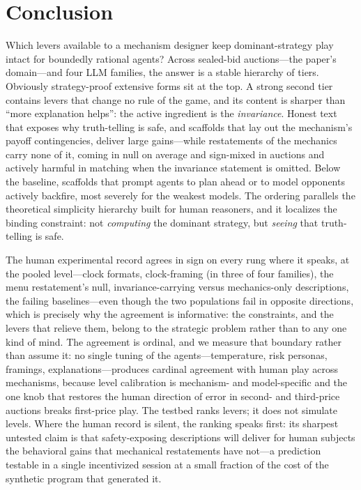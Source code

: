 
\section{Conclusion}\label{sec:conclusion}

Which levers available to a mechanism designer keep dominant-strategy play intact for boundedly rational agents? Across sealed-bid auctions---the paper's domain---and four LLM families, the answer is a stable hierarchy of tiers. Obviously strategy-proof extensive forms sit at the top. A strong second tier contains levers that change no rule of the game, and its content is sharper than ``more explanation helps'': the active ingredient is the \emph{invariance}. Honest text that exposes why truth-telling is safe, and scaffolds that lay out the mechanism's payoff contingencies, deliver large gains---while restatements of the mechanics carry none of it, coming in null on average and sign-mixed in auctions and actively harmful in matching when the invariance statement is omitted. Below the baseline, scaffolds that prompt agents to plan ahead or to model opponents actively backfire, most severely for the weakest models. The ordering parallels the theoretical simplicity hierarchy built for human reasoners, and it localizes the binding constraint: not \emph{computing} the dominant strategy, but \emph{seeing} that truth-telling is safe.

The human experimental record agrees in sign on every rung where it speaks, at the pooled level---clock formats, clock-framing (in three of four families), the menu restatement's null, invariance-carrying versus mechanics-only descriptions, the failing baselines---even though the two populations fail in opposite directions, which is precisely why the agreement is informative: the constraints, and the levers that relieve them, belong to the strategic problem rather than to any one kind of mind. The agreement is ordinal, and we measure that boundary rather than assume it: no single tuning of the agents---temperature, risk personas, framings, explanations---produces cardinal agreement with human play across mechanisms, because level calibration is mechanism- and model-specific and the one knob that restores the human direction of error in second- and third-price auctions breaks first-price play. The testbed ranks levers; it does not simulate levels. Where the human record is silent, the ranking speaks first: its sharpest untested claim is that safety-exposing descriptions will deliver for human subjects the behavioral gains that mechanical restatements have not---a prediction testable in a single incentivized session at a small fraction of the cost of the synthetic program that generated it.

